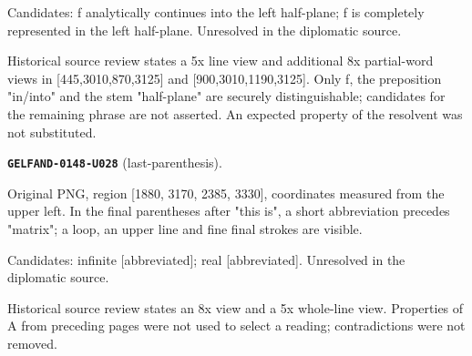 \documentclass[11pt]{article}
\theoremstyle{definition}
\theoremstyle{remark}
\begin{document}
Candidates: f analytically continues into the left half-plane; f is completely represented in the left half-plane. Unresolved in the diplomatic source.\par
Historical source review states a 5x line view and additional 8x partial-word views in [445,3010,870,3125] and [900,3010,1190,3125]. Only f, the preposition "in/into" and the stem "half-plane" are securely distinguishable; candidates for the remaining phrase are not asserted. An expected property of the resolvent was not substituted.\par\medskip
\noindent\leavevmode{}\label{GELFAND-P001365:last-parenthesis:note}\textbf{\texttt{GELFAND-0148-U028}} (last-parenthesis).\par\nopagebreak[4]
Original PNG, region [1880, 3170, 2385, 3330], coordinates measured from the upper left. In the final parentheses after "this is", a short abbreviation precedes "matrix"; a loop, an upper line and fine final strokes are visible.\par
Candidates: infinite [abbreviated]; real [abbreviated]. Unresolved in the diplomatic source.\par
Historical source review states an 8x view and a 5x whole-line view. Properties of A from preceding pages were not used to select a reading; contradictions were not removed.\par\medskip
\end{document}
